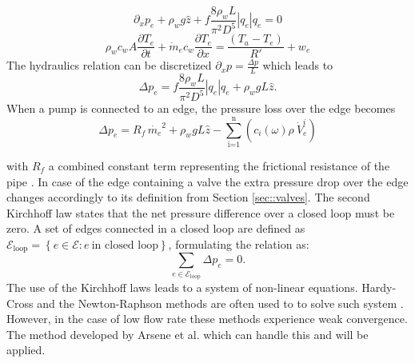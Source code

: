 \begin{equation}\label{eq::formom}
\partial_x p_e + \rho_w g \hat{z} + f \frac{8\rho_w L}{\pi^2 D^5}\left|q_e\right|q_e =0
\end{equation}
\begin{equation}\label{eq::forsimpipePDE}
\rho_w c_w A \frac{\partial T_e}{\partial t} + \dot{m}_e c_w \frac{\partial T_e}{\partial x}=\frac{\left(T_a-T_e\right)}{R'} + w_e
\end{equation}
The hydraulics relation can be  discretized $\partial_x p = \frac{\Delta p}{L}$ which leads to
\begin{equation}\label{eq::thermopde}
    \Delta p_e = f \frac{8\rho_w L}{\pi^2 D^5}\left|q_e\right|q_e + \rho_w g L \hat{z}.
\end{equation}
When a pump is connected to an edge, the pressure loss over the edge becomes
\begin{equation}
    \Delta p_e = R_{f}\,\dot{m_e}^2 + \rho_w g L \hat{z} - \sum^{\text{n}}_{\text{i=1}} \left( c_i(\omega)  \rho \ \dot{V}^{i}_e \right)
\end{equation}

with $R_{f}$ a combined constant term representing the frictional resistance of the pipe \cite{sibeijn2025economic}. In case of the edge containing a valve the extra pressure drop over the edge changes accordingly to its definition from Section \ref{sec::valves}. The second Kirchhoff law states that the net pressure difference over a closed loop must be zero. A set of edges connected in a closed loop are defined as $\mathcal{E}_{\text{loop}} = \left\{e \in \mathcal{E} : e \ \text{in closed loop}\right\}$, formulating the relation as:
\begin{equation}
    \sum_{e  \in \mathcal{E}_{\text{loop}}} \Delta p_e = 0.
\end{equation}
The use of the Kirchhoff laws leads to a system of non-linear equations. Hardy-Cross and the Newton-Raphson methods are often used to to solve such system \cite{KUNTUAROVA}. However, in the case of low flow rate these methods experience weak convergence. The method developed by Arsene et al. \cite{ARSENE} which can handle this and will be applied.  


